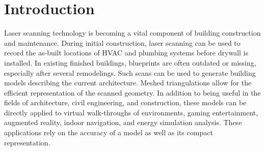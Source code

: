 \documentclass[12pt,onecolumn,oneside]{book}
\begin{document}

\newpage
{}
\setcounter{page}{1}

\chapter{Introduction}
\label{ch:introduction}

Laser scanning technology is becoming a vital component of building construction and maintenance.  During initial construction, laser scanning can be used to record the as-built locations of HVAC and plumbing systems before drywall is installed.  In existing finished buildings, blueprints are often outdated or missing, especially after several remodelings.  Such scans can be used to generate building models describing the current architecture.  Meshed triangulations allow for the efficient representation of the scanned geometry.  In addition to being useful in the fields of architecture, civil engineering, and construction, these models can be directly applied to virtual walk-throughs of environments, gaming entertainment, augmented reality, indoor navigation, and energy simulation analysis.  These applications rely on the accuracy of a model as well as its compact representation.
\end{document}
